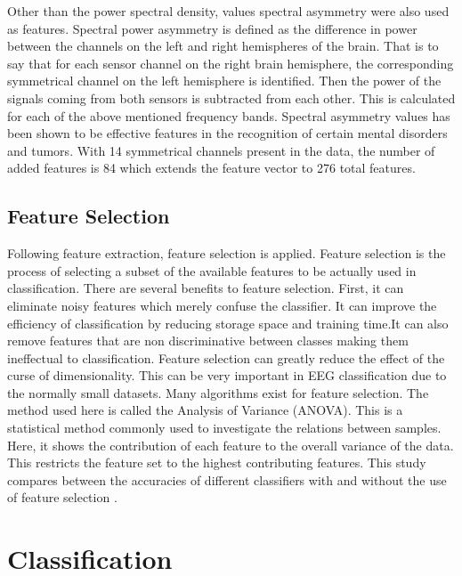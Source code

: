 \documentclass[12pt, a4paper, fleqn]{memoir}%
\begin{document}
\newpage
Other than the power spectral density, values spectral asymmetry were also used as features. Spectral power asymmetry is defined as the difference in power between the channels on the left and right hemispheres of the brain. That is to say that for each sensor channel on the right brain hemisphere, the corresponding symmetrical channel on the left hemisphere is identified. Then the power of the signals coming from both sensors is subtracted from each other. This is calculated for each of the above mentioned frequency bands. Spectral asymmetry values has been shown to be effective features in the recognition of certain mental disorders and tumors. With 14 symmetrical channels present in the data, the number of added features is 84 which extends the feature vector to 276 total features.

\section{Feature Selection}
\label{sec:FeatureSelection}
Following feature extraction, feature selection is applied. Feature selection is the process of selecting a subset of the available features to be actually used in classification. There are several benefits to feature selection. First, it can eliminate noisy features which merely confuse the classifier. It can improve the efficiency of classification by reducing storage space and training time.It can also remove features that are non discriminative between classes making them ineffectual to classification. Feature selection can greatly reduce the effect of the curse of dimensionality. This can be very important in EEG classification due to the normally small datasets. Many algorithms exist for feature selection. The method used here is called the Analysis of Variance (ANOVA). This is a statistical method commonly used to investigate the relations between samples. Here, it shows the contribution of each feature to the overall variance of the data. This restricts the feature set to the highest contributing features. This study compares between the accuracies of different classifiers with and without the use of feature selection \cite{guyon2003introduction}.

\chapter{Classification} 
\label{chap:Classification}
\end{document}
